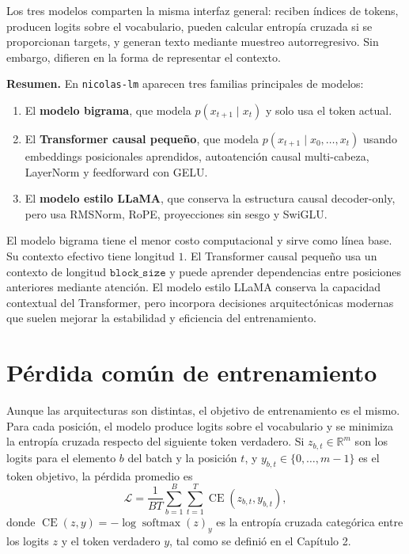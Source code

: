 \documentclass[11pt]{report}
\newenvironment{tcolorbox}[1][]{\par\medskip\noindent\ignorespaces}{\par\medskip}
\theoremstyle{definition}
\theoremstyle{plain}
\numberwithin{equation}{section}
\begin{document}
Los tres modelos comparten la misma interfaz general: reciben índices de tokens, producen logits sobre el vocabulario, pueden calcular entropía cruzada si se proporcionan targets, y generan texto mediante muestreo autorregresivo. Sin embargo, difieren en la forma de representar el contexto.

\begin{tcolorbox}[colback=blue!8, colframe=blue!8, boxrule=0pt]
\textbf{Resumen.} En \texttt{nicolas-lm} aparecen tres familias principales de modelos:
\begin{enumerate}
    \item El \textbf{modelo bigrama}, que modela \(p(x_{t+1}\mid x_t)\) y solo usa el token actual.
    \item El \textbf{Transformer causal pequeño}, que modela \(p(x_{t+1}\mid x_0,\ldots,x_t)\) usando embeddings posicionales aprendidos, autoatención causal multi-cabeza, LayerNorm y feedforward con GELU.
    \item El \textbf{modelo estilo LLaMA}, que conserva la estructura causal decoder-only, pero usa RMSNorm, RoPE, proyecciones sin sesgo y SwiGLU.
\end{enumerate}
\end{tcolorbox}

El modelo bigrama tiene el menor costo computacional y sirve como línea base. Su contexto efectivo tiene longitud \(1\). El Transformer causal pequeño usa un contexto de longitud \(\texttt{block\_size}\) y puede aprender dependencias entre posiciones anteriores mediante atención. El modelo estilo LLaMA conserva la capacidad contextual del Transformer, pero incorpora decisiones arquitectónicas modernas que suelen mejorar la estabilidad y eficiencia del entrenamiento.

\section{Pérdida común de entrenamiento}

Aunque las arquitecturas son distintas, el objetivo de entrenamiento es el mismo. Para cada posición, el modelo produce logits sobre el vocabulario y se minimiza la entropía cruzada respecto del siguiente token verdadero. Si \(z_{b,t}\in\mathbb{R}^m\) son los logits para el elemento \(b\) del batch y la posición \(t\), y \(y_{b,t}\in\{0,\ldots,m-1\}\) es el token objetivo, la pérdida promedio es
\begin{equation*}
    \mathcal{L}
    =
    \frac{1}{BT}
    \sum_{b=1}^{B}
    \sum_{t=1}^{T}
    \operatorname{CE}(z_{b,t},y_{b,t}),
\end{equation*}
donde \(\operatorname{CE}(z,y)=-\log\operatorname{softmax}(z)_y\) es la entropía cruzada categórica entre los logits \(z\) y el token verdadero \(y\), tal como se definió en el Capítulo 2.
\end{document}
